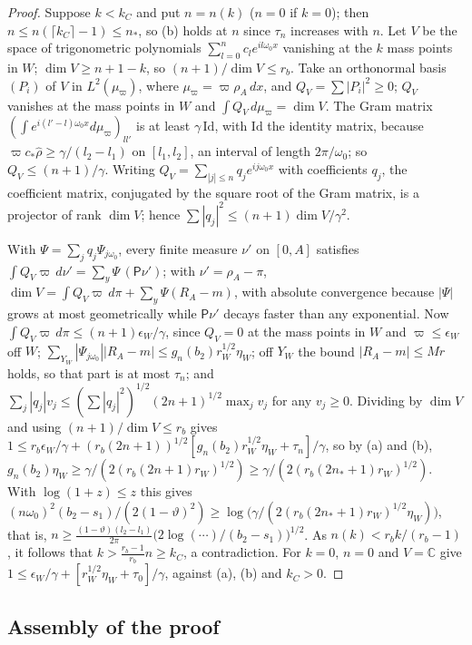 \begin{proof}
Suppose $k<k_C$ and put $n=n(k)$ ($n=0$ if $k=0$); then $n\le n(\lceil k_C\rceil-1)\le n_*$, so (b) holds at $n$ since $\tau_n$ increases
with $n$. Let $V$ be the space of trigonometric polynomials $\sum_{l=0}^nc_le^{il\omega_0x}$ vanishing at the $k$ mass points in $W$;
$\dim V\ge n+1-k$, so $(n+1)/\dim V\le r_b$. Take an orthonormal basis $(P_i)$ of $V$ in $L^2(\mu_\varpi)$, where $\mu_\varpi=\varpi\rho_A\,dx$, and
$Q_V=\sum|P_i|^2\ge0$; $Q_V$ vanishes at the mass points in $W$ and $\int Q_V\,d\mu_\varpi=\dim V$. The Gram matrix
$(\int e^{i(l'-l)\omega_0x}d\mu_\varpi)_{ll'}$ is at least $\gamma\,\mathrm{Id}$, with $\mathrm{Id}$ the identity matrix, because $\varpi c_*\hat\rho\ge\gamma/(l_2-l_1)$ on $[l_1,l_2]$, an
interval of length $2\pi/\omega_0$; so $Q_V\le(n+1)/\gamma$. Writing $Q_V=\sum_{|j|\le n}q_je^{ij\omega_0x}$ with coefficients $q_j$, the coefficient matrix,
conjugated by the square root of the Gram matrix, is a projector of rank $\dim V$; hence $\sum|q_j|^2\le(n+1)\dim V/\gamma^2$.

With $\Psi=\sum_jq_j\Psi_{j\omega_0}$, every finite measure $\nu'$ on $[0,A]$ satisfies $\int Q_V\varpi\,d\nu'=\sum_y\Psi\,(\mathsf P\nu')$; with
$\nu'=\rho_A-\pi$, $\dim V=\int Q_V\varpi\,d\pi+\sum_y\Psi(R_A-m)$, with absolute convergence because $|\Psi|$ grows at most geometrically
while $\mathsf P\nu'$ decays faster than any exponential. Now $\int Q_V\varpi\,d\pi\le(n+1)\epsilon_W/\gamma$, since $Q_V=0$ at the mass points
in $W$ and $\varpi\le\epsilon_W$ off $W$; $\sum_{Y_W}|\Psi_{j\omega_0}||R_A-m|\le g_n(b_2)r_W^{1/2}\eta_W$; off $Y_W$ the bound $|R_A-m|\le Mr$ holds, so
that part is at most $\tau_n$; and $\sum_j|q_j|v_j\le(\sum|q_j|^2)^{1/2}(2n+1)^{1/2}\max_jv_j$ for any $v_j\ge 0$. Dividing by $\dim V$ and using
$(n+1)/\dim V\le r_b$ gives $1\le r_b\epsilon_W/\gamma+(r_b(2n+1))^{1/2}[g_n(b_2)r_W^{1/2}\eta_W+\tau_n]/\gamma$, so by (a) and (b),
$g_n(b_2)\eta_W\ge\gamma/(2(r_b(2n+1)r_W)^{1/2})\ge\gamma/(2(r_b(2n_*+1)r_W)^{1/2})$. With $\log(1+z)\le z$ this gives $(n\omega_0)^2(b_2-s_1)/(2(1-\vartheta)^2)\ge\log\bigl(\gamma/(2(r_b(2n_*+1)r_W)^{1/2}\eta_W)\bigr)$, that is,
$n\ge\frac{(1-\vartheta)(l_2-l_1)}{2\pi}\bigl(2\log(\cdots)/(b_2-s_1)\bigr)^{1/2}$. As $n(k)<r_bk/(r_b-1)$, it follows that $k>\frac{r_b-1}{r_b}n\ge k_C$, a contradiction. For $k=0$, $n=0$ and $V=\mathbb C$ give
$1\le\epsilon_W/\gamma+[r_W^{1/2}\eta_W+\tau_0]/\gamma$, against (a), (b) and $k_C>0$.
\end{proof}

\subsection{Assembly of the proof}\label{app:C-proof}

